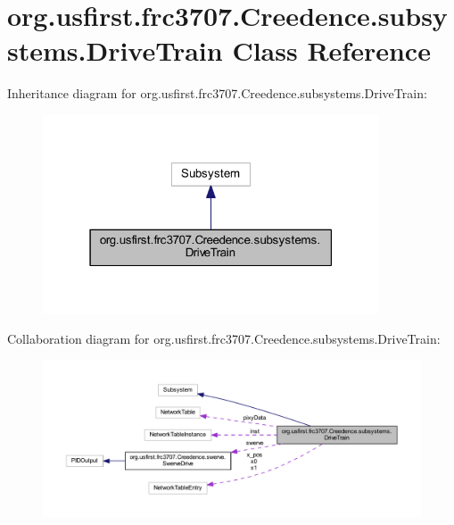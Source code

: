 \hypertarget{classorg_1_1usfirst_1_1frc3707_1_1_creedence_1_1subsystems_1_1_drive_train}{}\section{org.\+usfirst.\+frc3707.\+Creedence.\+subsystems.\+Drive\+Train Class Reference}
\label{classorg_1_1usfirst_1_1frc3707_1_1_creedence_1_1subsystems_1_1_drive_train}


Inheritance diagram for org.\+usfirst.\+frc3707.\+Creedence.\+subsystems.\+Drive\+Train\+:
\nopagebreak
\begin{figure}[H]
\begin{center}
\leavevmode
\includegraphics[width=283pt]{classorg_1_1usfirst_1_1frc3707_1_1_creedence_1_1subsystems_1_1_drive_train__inherit__graph}
\end{center}
\end{figure}


Collaboration diagram for org.\+usfirst.\+frc3707.\+Creedence.\+subsystems.\+Drive\+Train\+:
\nopagebreak
\begin{figure}[H]
\begin{center}
\leavevmode
\includegraphics[width=350pt]{classorg_1_1usfirst_1_1frc3707_1_1_creedence_1_1subsystems_1_1_drive_train__coll__graph}
\end{center}
\end{figure}
